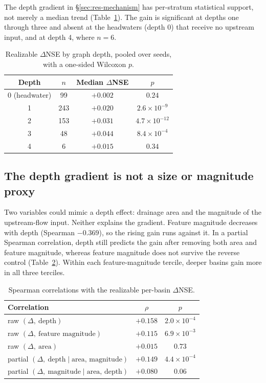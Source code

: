 \documentclass[11pt]{article}
\begin{document}
The depth gradient in \S\ref{sec:res-mechanism} has per-stratum statistical support, not merely a
median trend (Table~\ref{tab:depth}). The gain is significant at depths one through three and absent
at the headwaters (depth 0) that receive no upstream input, and at depth 4, where $n=6$.

\begin{table}[h]
\centering
\caption{Realizable $\Delta$NSE by graph depth, pooled over seeds, with a one-sided Wilcoxon $p$.}
\label{tab:depth}
\begin{tabular}{cccc}
\toprule
Depth & $n$ & Median $\Delta$NSE & $p$ \\
\midrule
0 (headwater) & 99 & $+0.002$ & $0.24$ \\
1 & 243 & $+0.020$ & $2.6\times10^{-9}$ \\
2 & 153 & $+0.031$ & $4.7\times10^{-12}$ \\
3 & 48 & $+0.044$ & $8.4\times10^{-4}$ \\
4 & 6 & $+0.015$ & $0.34$ \\
\bottomrule
\end{tabular}
\end{table}

\subsection{The depth gradient is not a size or magnitude proxy}
\label{app:confound}

Two variables could mimic a depth effect: drainage area and the magnitude of the upstream-flow input.
Neither explains the gradient. Feature magnitude decreases with depth (Spearman $-0.369$), so the
rising gain runs against it. In a partial Spearman correlation, depth still predicts the gain after
removing both area and feature magnitude, whereas feature magnitude does not survive the reverse
control (Table~\ref{tab:confound}). Within each feature-magnitude tercile, deeper basins gain more in
all three terciles.

\begin{table}[h]
\centering
\caption{Spearman correlations with the realizable per-basin $\Delta$NSE.}
\label{tab:confound}
\begin{tabular}{lcc}
\toprule
Correlation & $\rho$ & $p$ \\
\midrule
raw $(\Delta,\ \text{depth})$ & $+0.158$ & $2.0\times10^{-4}$ \\
raw $(\Delta,\ \text{feature magnitude})$ & $+0.115$ & $6.9\times10^{-3}$ \\
raw $(\Delta,\ \text{area})$ & $+0.015$ & $0.73$ \\
partial $(\Delta,\ \text{depth}\mid\text{area, magnitude})$ & $+0.149$ & $4.4\times10^{-4}$ \\
partial $(\Delta,\ \text{magnitude}\mid\text{area, depth})$ & $+0.080$ & $0.06$ \\
\bottomrule
\end{tabular}
\end{table}
\end{document}
